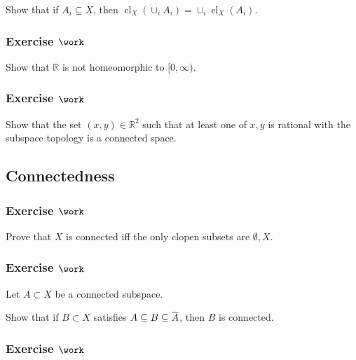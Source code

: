 Show that if \(A_i \subseteq X\), then
\({ \operatorname{cl}} _X(\cup_i A_i) = \cup_i { \operatorname{cl}} _X(A_i)\).

\hypertarget{exercise-work-3}{%
\subsubsection{\texorpdfstring{Exercise
\(\work\)}{Exercise \textbackslash work}}\label{exercise-work-3}}

Show that \({\mathbb{R}}\) is not homeomorphic to \([0, \infty)\).

\hypertarget{exercise-work-4}{%
\subsubsection{\texorpdfstring{Exercise
\(\work\)}{Exercise \textbackslash work}}\label{exercise-work-4}}

Show that the set \((x, y) \in {\mathbb{R}}^2\) such that at least one
of \(x, y\) is rational with the subspace topology is a connected space.

\hypertarget{connectedness-1}{%
\subsection{Connectedness}\label{connectedness-1}}

\hypertarget{exercise-work-5}{%
\subsubsection{\texorpdfstring{Exercise
\(\work\)}{Exercise \textbackslash work}}\label{exercise-work-5}}

Prove that \(X\) is connected iff the only clopen subsets are
\(\emptyset, X\).

\hypertarget{exercise-work-6}{%
\subsubsection{\texorpdfstring{Exercise
\(\work\)}{Exercise \textbackslash work}}\label{exercise-work-6}}

Let \(A \subset X\) be a connected subspace.

Show that if \(B\subset X\) satisfies
\(A\subseteq B \subseteq \mkern 1.5mu\overline{\mkern-1.5muA\mkern-1.5mu}\mkern 1.5mu\),
then \(B\) is connected.

\hypertarget{exercise-work-7}{%
\subsubsection{\texorpdfstring{Exercise
\(\work\)}{Exercise \textbackslash work}}\label{exercise-work-7}}

